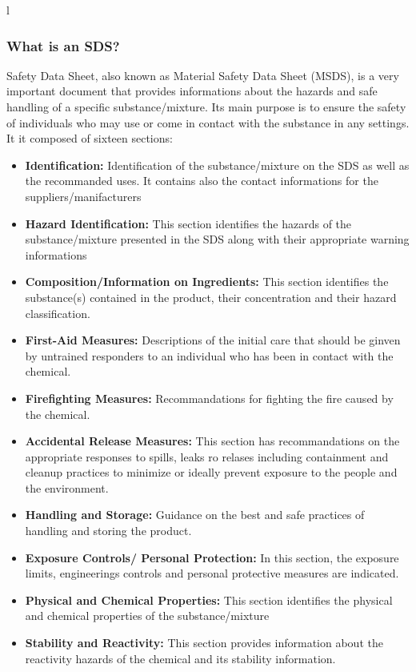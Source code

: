 l\documentclass[a4paper,12pt,twoside]{report}
\begin{document}
\subsubsection{What is an SDS?}\label{sds?}
Safety Data Sheet, also known as Material Safety Data Sheet (MSDS), is a very important document that provides informations about the hazards and safe handling of a specific substance/mixture. Its main purpose is to ensure the safety of individuals who may use or come in contact with the substance in any settings. It it composed of sixteen sections:
\begin{itemize}
\item \textbf{Identification:} Identification of the substance/mixture on the SDS as well as the recommanded uses. It contains also the contact informations for the suppliers/manifacturers
\item  \textbf{Hazard Identification:} This section identifies the hazards of the substance/mixture presented in the SDS along with their appropriate warning informations
\item  \textbf{Composition/Information on Ingredients:} This section identifies the substance(s) contained in the product, their concentration and their hazard classification.
\item \textbf{First-Aid Measures:} Descriptions of the initial care that should be ginven by untrained responders to an individual who has been in contact with the chemical.
\item \textbf{Firefighting Measures:} Recommandations for fighting the fire caused by the chemical.
\item \textbf{Accidental Release Measures:} This section has recommandations on the appropriate responses to spills, leaks ro relases including containment and cleanup practices to minimize or ideally prevent exposure to the people and the environment.
\item \textbf{Handling and Storage:} Guidance on the best and safe practices of handling and storing the product.
\item \textbf{Exposure Controls/ Personal Protection:} In this section, the exposure limits, engineerings controls and personal protective measures are indicated.
\item \textbf{Physical and Chemical Properties:} This section identifies the physical and chemical properties of the substance/mixture
\item \textbf{Stability and Reactivity:} This section provides information about the reactivity hazards of the chemical and its stability information.

\end{itemize}
\end{document}
